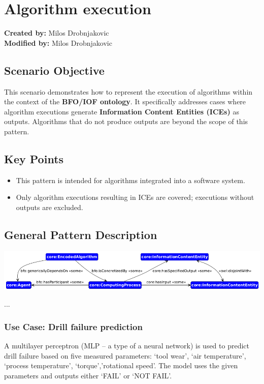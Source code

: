 \section{Algorithm execution}
\label{sec-algorithm-execution}

\textbf{Created by:} Milos Drobnjakovic \\
\textbf{Modified by:} Milos Drobnjakovic \\

\subsection*{Scenario Objective}


This scenario demonstrates how to represent the execution of algorithms within the context of the \textbf{BFO/IOF ontology}. It specifically addresses cases where algorithm executions generate \textbf{Information Content Entities (ICEs)} as outputs. Algorithms that do not produce outputs are beyond the scope of this pattern.

\subsection*{Key Points}
\begin{itemize}
    \item This pattern is intended for algorithms integrated into a software system.
    \item Only algorithm executions resulting in ICEs are covered; executions without outputs are excluded.
\end{itemize}


\subsection*{General Pattern Description}
\includegraphics[scale=0.6]{scenarios/algorithm-execution/images/algorithm-execution-general.png}

...

\subsubsection*{Use Case: Drill failure prediction} 
A multilayer perceptron (MLP – a type of a neural network) is used to predict drill failure based on five measured parameters: ‘tool wear’, ‘air temperature’, ‘process temperature’, ‘torque’,’rotational speed’. The model uses the given parameters and outputs either ‘FAIL’ or ‘NOT FAIL’.

